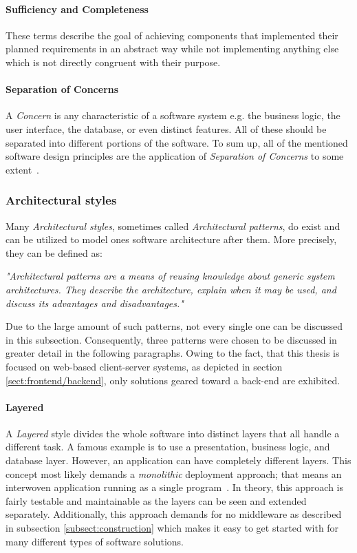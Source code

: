 \documentclass[12pt,a4paper,twoside]{report}
\begin{document}
\paragraph{Sufficiency and Completeness}
These terms describe the goal of achieving components that implemented their
planned requirements in an abstract way while not implementing anything else
which is not directly congruent with their purpose.

\paragraph{Separation of Concerns}
A \textit{Concern} is any characteristic of a software system
e.g. the business logic, the user interface, the database, or even distinct features.
All of these should be separated into different portions of the software.
To sum up, all of the mentioned software design principles are the application
of \textit{Separation of Concerns} to some extent~\cite{mitchell-managing-se}.


\subsubsection{Architectural styles} \label{subsubsect:architectural-styles}

Many \textit{Architectural styles}, sometimes called \textit{Architectural patterns},
do exist and can be utilized to model ones software architecture after them.
More precisely, they can be defined as:
\begin{displayquote}
\emph{"Architectural patterns are a means of reusing knowledge about
generic system architectures. They describe the architecture,
explain when it may be used, and discuss its advantages and disadvantages."}~\cite{sommerville-se}
\end{displayquote}
Due to the large amount of such patterns, not every single one can be discussed
in this subsection. Consequently, three patterns were chosen to be discussed
in greater detail in the following paragraphs. Owing to the fact, that this
thesis is focused on web-based client-server systems, as depicted in
section \ref{sect:frontend/backend}, only solutions geared toward a back-end are exhibited.

\paragraph{Layered}
A \textit{Layered} style divides the whole software into distinct layers that
all handle a different task. A famous example is to use a presentation,
business logic, and database layer. However, an application can have completely different
layers. This concept most likely demands a \textit{monolithic} deployment approach;
that means an interwoven application running as a single program~\cite{monolith}.
In theory, this approach is fairly testable and maintainable
as the layers can be seen and extended separately. Additionally, this approach demands
for no middleware as described in subsection \ref{subsect:construction} which
makes it easy to get started with for many different types of software solutions.
\end{document}
